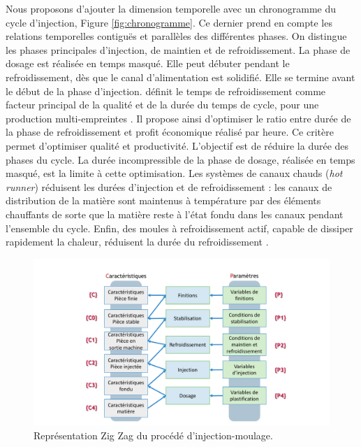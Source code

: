 Nous proposons d’ajouter la dimension temporelle avec un chronogramme du cycle d’injection, Figure \ref{fig:chronogramme}.
Ce dernier prend en compte les relations temporelles contiguës et parallèles des différentes phases.
On distingue les phases principales d’injection, de maintien et de refroidissement.
La phase de dosage est réalisée en temps masqué.
Elle peut débuter pendant le refroidissement, dès que le canal d’alimentation est solidifié.
Elle se termine avant le début de la phase d'injection.
\citeauthor{thyregod_modelling_2001} définit le temps de refroidissement comme facteur principal de la qualité et de la durée du temps de cycle, pour une production multi-empreintes \cite{thyregod_modelling_2001}.
Il propose ainsi d'optimiser le ratio entre durée de la phase de refroidissement et profit économique réalisé par heure.
Ce critère permet d'optimiser qualité et productivité.
L’objectif est de réduire la durée des phases du cycle.
La durée incompressible de la phase de dosage, réalisée en temps masqué, est la limite à cette optimisation.
Les systèmes de canaux chauds (\textit{hot runner}) réduisent les durées d’injection et de refroidissement : les canaux de distribution de la matière sont maintenus à température par des éléments chauffants de sorte que la matière reste à l’état fondu dans les canaux pendant l’ensemble du cycle.
Enfin, des moules à refroidissement actif, capable de dissiper rapidement la chaleur, réduisent la durée du refroidissement \cite{kazmer_towards_1999}.

\begin{figure}[hbtp]
	\centering
	\includegraphics[width=\textwidth,height=\textheight,keepaspectratio]{../Chap1/Figures/Sapristi_ZigZag.pdf}
	\caption{Représentation Zig Zag du procédé d'injection-moulage.}
	\label{fig:zigzag}
\end{figure}

